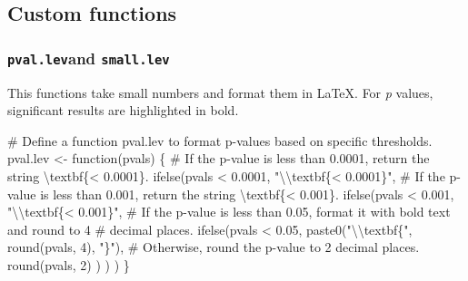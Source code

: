 \documentclass[
  bookmarksnumbered]{article}
\newenvironment{Shaded}{\begin{snugshade}}{\end{snugshade}}
\newcommand{\CommentTok}[1]{\textcolor[rgb]{0.50,0.62,0.50}{#1}}
\newcommand{\ControlFlowTok}[1]{\textcolor[rgb]{0.94,0.87,0.69}{#1}}
\newcommand{\DecValTok}[1]{\textcolor[rgb]{0.86,0.86,0.80}{#1}}
\newcommand{\FloatTok}[1]{\textcolor[rgb]{0.75,0.75,0.82}{#1}}
\newcommand{\FunctionTok}[1]{\textcolor[rgb]{0.94,0.94,0.56}{#1}}
\newcommand{\NormalTok}[1]{\textcolor[rgb]{0.80,0.80,0.80}{#1}}
\newcommand{\OtherTok}[1]{\textcolor[rgb]{0.94,0.94,0.56}{#1}}
\newcommand{\SpecialCharTok}[1]{\textcolor[rgb]{0.86,0.64,0.64}{#1}}
\newcommand{\StringTok}[1]{\textcolor[rgb]{0.80,0.58,0.58}{#1}}
\begin{document}
\subsection{Custom functions}\label{custom-functions}

\subsubsection{\texorpdfstring{\texttt{pval.lev}and \texttt{small.lev}}{pval.levand small.lev}}\label{pval.levand-small.lev}

This functions take small numbers and format them in \LaTeX. For \emph{p} values, significant results are highlighted in bold.

\begin{Shaded}
\begin{Highlighting}[]
\CommentTok{\# Define a function \textquotesingle{}pval.lev\textquotesingle{} to format p{-}values based on specific thresholds.}
\NormalTok{pval.lev }\OtherTok{\textless{}{-}} \ControlFlowTok{function}\NormalTok{(pvals) \{}
  \CommentTok{\# If the p{-}value is less than 0.0001, return the string \textquotesingle{}\textbackslash{}textbf\{\textless{} 0.0001\}\textquotesingle{}.}
  \FunctionTok{ifelse}\NormalTok{(pvals }\SpecialCharTok{\textless{}} \FloatTok{0.0001}\NormalTok{,}
         \StringTok{"}\SpecialCharTok{\textbackslash{}\textbackslash{}}\StringTok{textbf\{\textless{} 0.0001\}"}\NormalTok{,}
         \CommentTok{\# If the p{-}value is less than 0.001, return the string \textquotesingle{}\textbackslash{}textbf\{\textless{} 0.001\}\textquotesingle{}.}
         \FunctionTok{ifelse}\NormalTok{(pvals }\SpecialCharTok{\textless{}} \FloatTok{0.001}\NormalTok{,}
                \StringTok{"}\SpecialCharTok{\textbackslash{}\textbackslash{}}\StringTok{textbf\{\textless{} 0.001\}"}\NormalTok{,}
                \CommentTok{\# If the p{-}value is less than 0.05, format it with bold text and round to 4}
                \CommentTok{\# decimal places.}
                \FunctionTok{ifelse}\NormalTok{(pvals }\SpecialCharTok{\textless{}} \FloatTok{0.05}\NormalTok{,}
                       \FunctionTok{paste0}\NormalTok{(}\StringTok{"}\SpecialCharTok{\textbackslash{}\textbackslash{}}\StringTok{textbf\{"}\NormalTok{, }\FunctionTok{round}\NormalTok{(pvals, }\DecValTok{4}\NormalTok{), }\StringTok{"\}"}\NormalTok{),}
                       \CommentTok{\# Otherwise, round the p{-}value to 2 decimal places.}
                       \FunctionTok{round}\NormalTok{(pvals, }\DecValTok{2}\NormalTok{)}
\NormalTok{                )}
\NormalTok{         )}
\NormalTok{  )}
\NormalTok{\}}



\end{Highlighting}
\end{Shaded}
\end{document}
